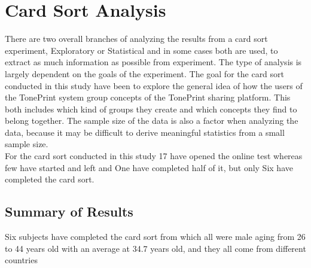 \chapter{Card Sort Analysis}
\label{CardSortAnalysis}
%
There are two overall branches of analyzing the results from a card sort experiment, Exploratory or Statistical and in some cases both are used, to extract as much information as possible from experiment. The type of analysis is largely dependent on the goals of the experiment. The goal for the card sort conducted in this study have been to explore the general idea of how the users of the TonePrint system group concepts of the TonePrint sharing platform. This both includes which kind of groups they create and which concepts they find to belong together. The sample size of the data is also a factor when analyzing the data, because it may be difficult to derive meaningful statistics from a small sample size. \\
For the card sort conducted in this study 17 have opened the online test whereas few have started and left and One have completed half of it, but only Six have completed the card sort.

\section{Summary of Results}
\label{SummaryResults}
%
Six subjects have completed the card sort from which all were male aging from 26 to 44 years old with an average at 34.7 years old, and they all come from different countries 